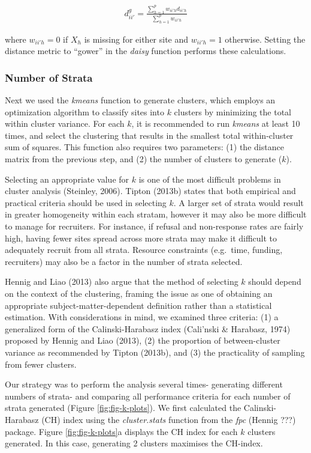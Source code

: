 \documentclass[man,floatsintext]{apa6}
\begin{document}
\begin{align}
  d^{g}_{ii'} = \frac{\sum^p_{h = 1}w_{ii'h}d_{ii'h}}{\sum^p_{h = 1}w_{ii'h}}
\end{align}

where \(w_{ii'h} = 0\) if \(X_h\) is missing for either site and \(w_{ii'h} = 1\) otherwise. Setting the distance metric to \enquote{gower} in the \emph{daisy} function performs these calculations.

\hypertarget{number-of-strata}{%
\subsubsection{Number of Strata}\label{number-of-strata}}

Next we used the \emph{kmeans} function to generate clusters, which employs an optimization algorithm to classify sites into \(k\) clusters by minimizing the total within cluster variance. For each \(k\), it is recommended to run \emph{kmeans} at least 10 times, and select the clustering that results in the smallest total within-cluster sum of squares. This function also requires two parameters: (1) the distance matrix from the previous step, and (2) the number of clusters to generate (\(k\)).

Selecting an appropriate value for \(k\) is one of the most difficult problems in cluster analysis (Steinley, 2006). Tipton (2013b) states that both empirical and practical criteria should be used in selecting \(k\). A larger set of strata would result in greater homogeneity within each stratam, however it may also be more difficult to manage for recruiters. For instance, if refusal and non-response rates are fairly high, having fewer sites spread across more strata may make it difficult to adequately recruit from all strata. Resource constraints (e.g.~time, funding, recruiters) may also be a factor in the number of strata selected.

Hennig and Liao (2013) also argue that the method of selecting \(k\) should depend on the context of the clustering, framing the issue as one of obtaining an appropriate subject-matter-dependent definition rather than a statistical estimation. With considerations in mind, we examined three criteria: (1) a generalized form of the Calinski-Harabasz index (Cali\a'nski \& Harabasz, 1974) proposed by Hennig and Liao (2013), (2) the proportion of between-cluster variance as recommended by Tipton (2013b), and (3) the practicality of sampling from fewer clusters.

Our strategy was to perform the analysis several times- generating different numbers of strata- and comparing all performance criteria for each number of strata generated (Figure \ref{fig:fig-k-plots}). We first calculated the Calinski-Harabasz (CH) index using the \emph{cluster.stats} function from the \emph{fpc} (Hennig ???) package. Figure \ref{fig:fig-k-plots}a displays the CH index for each \(k\) clusters generated. In this case, generating 2 clusters maximises the CH-index.
\end{document}
